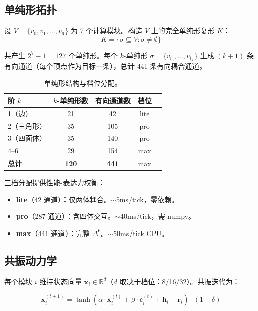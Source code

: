\documentclass[UTF8,11pt]{ctexart}
\begin{document}
\subsection{单纯形拓扑}
\label{sec:topology}

设 $V = \{v_0, v_1, \ldots, v_6\}$ 为 7 个计算模块。构造 $V$ 上的完全单纯形复形 $K$：
\begin{equation}
K = \{\sigma \subseteq V : \sigma \neq \emptyset\}
\end{equation}

共产生 $2^7 - 1 = 127$ 个单纯形。每个 $k$-单纯形 $\sigma = \{v_{i_0}, \ldots, v_{i_k}\}$ 生成 $(k+1)$ 条有向通道（每个顶点作为目标一条），总计 441 条有向耦合通道。

\begin{table}[htbp]
\centering
\caption{单纯形结构与档位分配。}
\label{tab:tiers}
\begin{tabular}{@{}lcccc@{}}
\toprule
阶 $k$ & $k$-单纯形数 & 有向通道数 & 档位 \\
\midrule
1（边） & 21 & 42 & lite \\
2（三角形） & 35 & 105 & pro \\
3（四面体） & 35 & 140 & pro \\
4--6 & 29 & 154 & max \\
\midrule
\textbf{总计} & \textbf{120} & \textbf{441} & max \\
\bottomrule
\end{tabular}
\end{table}

三档分配提供性能-表达力权衡：
\begin{itemize}[leftmargin=*]
\item \textbf{lite}（42 通道）：仅两体耦合。$\sim$5ms/tick，零依赖。
\item \textbf{pro}（287 通道）：含四体交互。$\sim$40ms/tick，需 numpy。
\item \textbf{max}（441 通道）：完整 $\Delta^6$。$\sim$50ms/tick CPU。
\end{itemize}

\subsection{共振动力学}
\label{sec:dynamics}

每个模块 $i$ 维持状态向量 $\mathbf{x}_i \in \mathbb{R}^d$（$d$ 取决于档位：8/16/32）。共振迭代为：

\begin{equation}
\mathbf{x}_i^{(t+1)} = \tanh\!\left(\alpha \cdot \mathbf{x}_i^{(t)} + \beta \cdot \mathbf{c}_i^{(t)} + \mathbf{h}_i + \mathbf{r}_i\right) \cdot (1 - \delta)
\end{equation}
\end{document}
